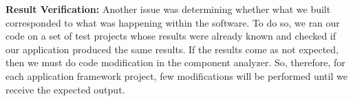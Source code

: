 \textbf{Result Verification: }Another issue was determining whether what we built corresponded to what was happening within the software. To do so, we ran our code on a set of test projects whose results were already known and checked if our application produced the same results. If the results come as not expected, then we must do code modification in the component analyzer. So, therefore, for each application framework project, few modifications will be performed until we receive the expected output.

%
